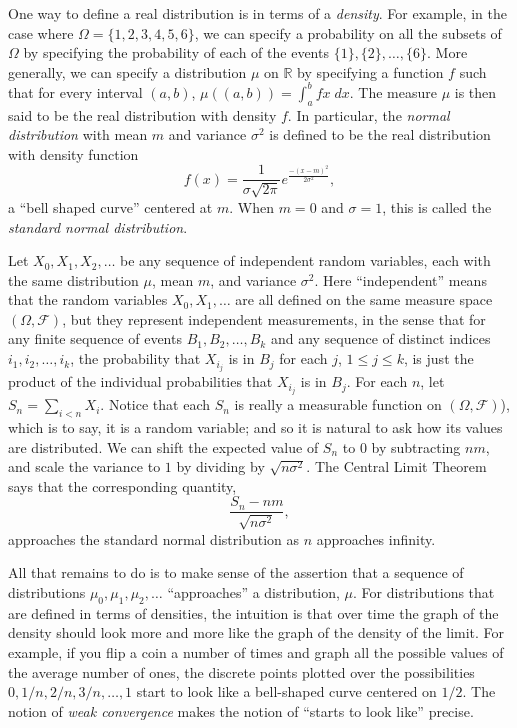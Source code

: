 \documentclass{article}
\newcommand{\RR}{\mathbb{R}}
\newcommand{\mdl}[1]{{\mathcal #1}}
\begin{document}
One way to define a real distribution is in terms of a \emph{density}. For example, in the case where $\Omega = \{1, 2, 3, 4, 5, 6\}$, we can specify a probability on all the subsets of $\Omega$ by specifying the probability of each of the events $\{1\}, \{2\}, \ldots, \{6\}$. More generally, we can specify a distribution $\mu$ on $\RR$ by specifying a function $f$ such that for every interval $(a, b)$, $\mu((a, b)) = \int_a^b f x \; \mathit{dx}$. The measure $\mu$ is then said to be the real distribution with density $f$. In particular, the \emph{normal distribution} with mean $m$ and variance $\sigma^2$ is defined to be the real distribution with density function
\[
f(x) = \frac{1}{\sigma \sqrt{2 \pi}} e^\frac{-(x - m)^2}{2 \sigma^2}, 
\]
a ``bell shaped curve'' centered at $m$. When $m = 0$ and $\sigma = 1$, this is called the \emph{standard normal distribution}.

Let $X_0, X_1, X_2, \ldots$ be any sequence of independent random variables, each with the same distribution $\mu$, mean $m$, and variance $\sigma^2$. Here ``independent'' means that the random variables $X_0, X_1, \ldots$ are all defined on the same measure space $(\Omega, \mdl F)$, but they represent independent measurements, in the sense that for any finite sequence of events $B_1, B_2, \ldots, B_k$ and any sequence of distinct indices $i_1, i_2, \ldots, i_k$, the probability that $X_{i_j}$ is in $B_j$ for each $j$, $1 \leq j \leq k$, is just the product of the individual probabilities that $X_{i_j}$ is in $B_j$. For each $n$, let $S_n = \sum_{i < n} X_i$. Notice that each $S_n$ is really a measurable function on $(\Omega, \mdl F)$), which is to say, it is a random variable; and so it is natural to ask how its values are distributed. We can shift the expected value of $S_n$ to $0$ by subtracting $n m$, and scale the variance to $1$ by dividing by $\sqrt{ n \sigma^2}$. The Central Limit Theorem says that the corresponding quantity,
\[
 \frac{S_n - nm}{\sqrt{n \sigma^2}},
\]
approaches the standard normal distribution as $n$ approaches infinity.

All that remains to do is to make sense of the assertion that a sequence of distributions $\mu_0, \mu_1, \mu_2, \ldots$ ``approaches'' a distribution, $\mu$. For distributions that are defined in terms of densities, the intuition is that over time the graph of the density should look more and more like the graph of the density of the limit. For example, if you flip a coin a number of times and graph all the possible values of the average number of ones, the discrete points plotted over the possibilities $0, 1/n, 2/n, 3/n, \ldots, 1$ start to look like a bell-shaped curve centered on $1 / 2$. The notion of \emph{weak convergence} makes the notion of ``starts to look like'' precise.
\end{document}
